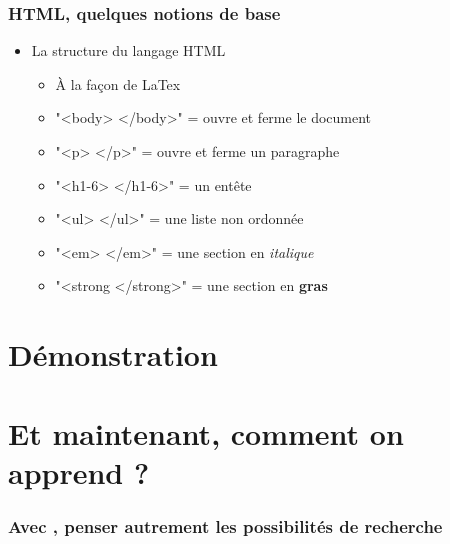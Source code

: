 \documentclass{beamer}
\begin{document}
      \begin{frame}
        \frametitle{HTML, quelques notions de base}
          \begin{itemize}
            \item<2-> La structure du langage HTML
              \begin{itemize}
                \item À la façon de LaTex
                \item "<body> </body>" = ouvre et ferme le document
                \item "<p> </p>" = ouvre et ferme un paragraphe
                \item "<h1-6> </h1-6>" = un entête
                \item "<ul> </ul>" =  une liste non ordonnée 
                \item "<em> </em>" = une section en \textit{italique}
                \item "<strong </strong>" = une section en \textbf{gras}
              \end{itemize}
            \end{itemize}
      \end{frame}
     \section{Démonstration}




\section{Et maintenant, comment on apprend ?}


    \begin{frame}
    
        \frametitle{Avec \R, penser autrement les possibilités de recherche} \vspace{1cm}
    
    \end{frame}


\end{document}
